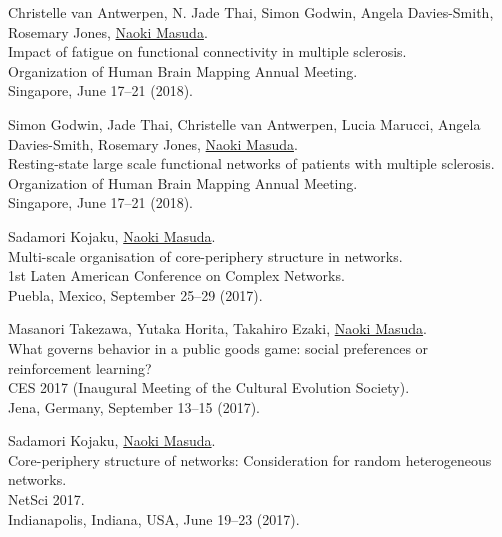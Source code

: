 \documentclass[11pt,letter]{article}
\begin{document}
\begin{etaremune}
\item Christelle van Antwerpen, N. Jade Thai, Simon Godwin, Angela Davies-Smith, Rosemary Jones, \underline{Naoki Masuda}.\\
Impact of fatigue on functional connectivity in multiple sclerosis.\\
Organization of Human Brain Mapping Annual Meeting.\\
Singapore, June 17--21 (2018).

\item Simon Godwin, Jade Thai, Christelle van Antwerpen, Lucia Marucci, Angela Davies-Smith, Rosemary Jones, \underline{Naoki Masuda}.\\
Resting-state large scale functional networks of patients with multiple sclerosis.\\
Organization of Human Brain Mapping Annual Meeting.\\
Singapore, June 17--21 (2018).

%

\item Sadamori Kojaku, \underline{Naoki Masuda}.\\
Multi-scale organisation of core-periphery structure in networks.\\
1st Laten American Conference on Complex Networks.\\
Puebla, Mexico, September 25--29 (2017).

\item Masanori Takezawa, Yutaka Horita, Takahiro Ezaki, \underline{Naoki Masuda}.\\
What governs behavior in a public goods game: social preferences or reinforcement learning?\\
CES 2017 (Inaugural Meeting of the Cultural Evolution Society).\\
Jena, Germany, September 13--15 (2017).

\item Sadamori Kojaku, \underline{Naoki Masuda}.\\
Core-periphery structure of networks: Consideration for random heterogeneous networks.\\ 
NetSci 2017.\\
Indianapolis, Indiana, USA, June 19--23 (2017).


\end{etaremune}
\end{document}
